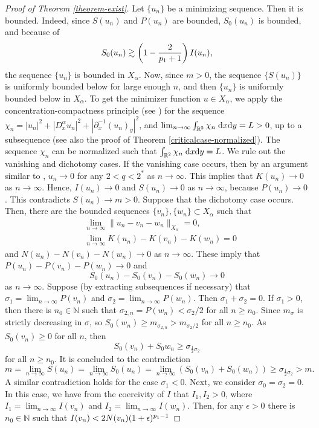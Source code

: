 \documentclass[10pt]{article}
\numberwithin{equation}{section}
\newcommand{\dz}{\;{\rm d}x{\rm d}y}
\newcommand{\N}{\mathbb{N}}
\newcommand{\x}{{X_\alpha}}
\newcommand{\nd}{{\partial_x^{-1}}}
\newcommand{\dx}{D_x^{\alpha}}
\newcommand{\al}{\alpha}
\newcommand{\rt}{{\mathbb{R}^2}}
\begin{document}
	\begin{proof}[Proof of Theorem \ref{theorem-exist}]
		Let $\{u_n\}$ be a minimizing sequence. Then it is bounded. Indeed, since $S(u_n)$ and $P(u_n)$ are bounded, $S_0(u_n)$ is bounded, and because of\[
		S_0(u_n)\gtrsim\left(1-\frac{2}{{p_1}+1}\right)I(u_n),
		\]
		the sequence $\{u_n\}$ is bounded in $\x$. Now, since $m>0$, the sequence $\{S(u_n)\}$ is uniformly bounded below for large enough $n$, and then $\{u_n\}$ is uniformly  bounded below in $X_\al$. To get the minimizer function $u\in X_\al$, we apply the concentration-compactness principle (see \cite{AMC,lps-0}) for the sequence $\chi_n=|u_n|^2+|\dx u_n|^2+|\nd(u_n)_y|^2$, and $\lim_{n\to\infty}\int_\rt\chi_n\dz=L>0$, up to a subsequence (see also the proof of Theorem \ref{criticalcase-normalized}). The sequence $\chi_n$ can be normalized such that $\int_\rt\chi_n\dz=L$. We rule out the vanishing and dichotomy cases. If the vanishing case occurs, then by an argument similar to \cite{dbs-0,dbs-1}, $u_n\to0$ for any $2<q<2^\ast$ as $n\to\infty$. This implies that $K(u_n)\to0$ as $n\to\infty$. Hence, $I(u_n)\to0$ and $S(u_n)\to0$ as $n\to\infty$, because $P(u_n)\to0$. This contradicts $S(u_n)\to m>0$. Suppose that the dichotomy case occurs. Then, there are the bounded sequences   $\{v_n\},\{w_n\}\subset X_\al$ such that
		\[
		\begin{split}
			&		\lim_{n\to\infty}\|u_n-v_n-w_n\|_{\x}=0,\\
			&\lim_{n\to\infty} K(u_n)-K(v_n)-K(w_n)=0 
		\end{split}
		\]
		and $N(u_n)-N(v_n)-N(w_n)\to0$ as $n\to\infty$. These imply that $P(u_n)-P(v_n)-P(w_n)\to0$ and $$S_0(u_n)-S_0(v_n)-S_0(w_n)\to0$$ as $n\to\infty$. Suppose (by extracting subsequences if necessary) that $\sigma_1=\lim_{n\to\infty}  P(v_n)$ and $\sigma_2=\lim_{n\to\infty} P(w_n)$. Then $\sigma_1+\sigma_2=0$. If $\sigma_1>0$, then there is $n_0\in\N$ such that $\sigma_{2,n}=P(w_n)<\sigma_2/2$ for all $n\geq n_0$. Since $m_\sigma$ is strictly decreasing in $\sigma$, so 
		$S_0(w_n)\geq m_{\sigma_{2,n}}>m_{\sigma_2/2}$ for all $n\geq n_0$. As $S_0(v_n)\geq0$  for all $n$, then 
		\[
		S_0(v_n)+S_0 w_n\geq\sigma_{\frac12\sigma_2}
		\]
		for all $n\geq n_0$. It is concluded to the contradiction
		\[
		m=\lim_{n\to\infty} S(u_n)=\lim_{n\to\infty}S_0(u_n)=\lim_{n\to\infty}\left(S_0(v_n)+S_0(w_n)\right)\geq\sigma_{\frac12\sigma_2}>m.
		\]
		A similar contradiction holds for the case $\sigma_1<0$. Next, we consider  $\sigma_0=\sigma_2=0$. In this case, we have from the coercivity of $I$ that $I_1,I_2>0$, where $I_1=\lim_{n\to\infty}I(v_n)$ and $I_2=\lim_{n\to\infty}I(w_n)$. Then, for any $\epsilon>0$  there is $n_0\in\N$ such that $I(v_n)<2N(v_n)(1+\epsilon)^{{p_1}-1}$

\end{proof}
\end{document}
